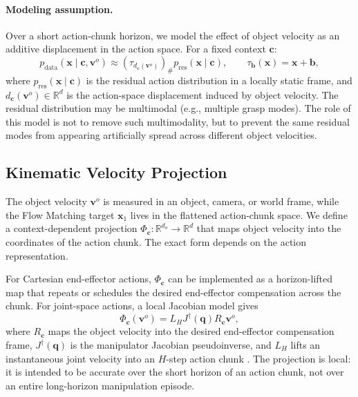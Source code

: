 \documentclass{article} %
\begin{document}
\paragraph{Modeling assumption.}
Over a short action-chunk horizon, we model the effect of object velocity as an
additive displacement in the action space. For a fixed context $\mathbf c$:
\begin{equation}
    p_{\mathrm{data}}(\mathbf x \mid \mathbf c, \mathbf v^{o})
    \approx
    \left(\tau_{d_{\mathbf c}(\mathbf v^{o})}\right)_{\#}
    p_{\mathrm{res}}(\mathbf x \mid \mathbf c),
    \qquad
    \tau_{\mathbf b}(\mathbf x) = \mathbf x + \mathbf b,
    \label{eq:velocity_pushforward_model}
\end{equation}
where $p_{\mathrm{res}}(\mathbf x \mid \mathbf c)$ is the residual action
distribution in a locally static frame, and
$d_{\mathbf c}(\mathbf v^{o}) \in \mathbb R^d$ is the action-space displacement
induced by object velocity. The residual distribution may be multimodal (e.g.,
multiple grasp modes). The role of this model is not to remove such
multimodality, but to prevent the same residual modes from appearing
artificially spread across different object velocities.

\subsection{Kinematic Velocity Projection}
\label{subsec:kinematic_projection}

The object velocity $\mathbf v^{o}$ is measured in an object, camera, or world
frame, while the Flow Matching target $\mathbf x_1$ lives in the flattened
action-chunk space. We define a context-dependent projection
$\Phi_{\mathbf c}:\mathbb R^{d_o}\rightarrow\mathbb R^d$ that maps object
velocity into the coordinates of the action chunk. The exact form depends on the
action representation.

For Cartesian end-effector actions, $\Phi_{\mathbf c}$ can be implemented as a
horizon-lifted map that repeats or schedules the desired end-effector
compensation across the chunk. For joint-space actions, a local Jacobian model
gives
\begin{equation}
    \Phi_{\mathbf c}(\mathbf v^{o})
    =
    L_H J^\dagger(\mathbf q) R_{\mathbf c}\mathbf v^{o},
    \label{eq:kinematic_projection}
\end{equation}
where $R_{\mathbf c}$ maps the object velocity into the desired end-effector
compensation frame, $J^\dagger(\mathbf q)$ is the manipulator Jacobian
pseudoinverse, and $L_H$ lifts an instantaneous joint velocity into an
$H$-step action chunk \citep{nakamura1991advanced,siciliano2009robotics}. The
projection is local: it is intended to be accurate over the short horizon of an
action chunk, not over an entire long-horizon manipulation episode.
\end{document}
